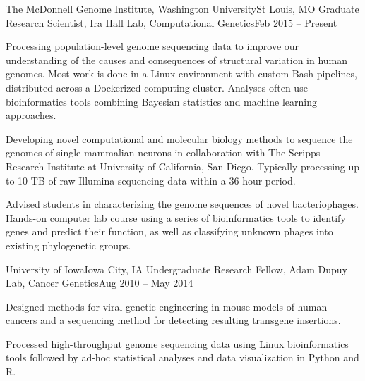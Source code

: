     \resumeSubheading
      {The McDonnell Genome Institute, Washington University}{St Louis, MO}
      {Graduate Research Scientist, Ira Hall Lab, Computational Genetics}{Feb 2015 -- Present}
      
      \resumeItemListStart
      
          {Processing population-level genome sequencing data to improve our understanding of the causes and consequences of structural variation in human genomes. Most work is done in a Linux environment with custom Bash pipelines, distributed across a Dockerized computing cluster. Analyses often use bioinformatics tools combining Bayesian statistics and machine learning approaches.}
       
          {Developing novel computational and molecular biology methods to sequence the genomes of single mammalian neurons in collaboration with The Scripps Research Institute at University of California, San Diego. Typically processing up to 10 TB of raw Illumina sequencing data within a 36 hour period.}
       
          {Advised students in characterizing the genome sequences of novel bacteriophages. Hands-on computer lab course using a series of bioinformatics tools to identify genes and predict their function, as well as classifying unknown phages into existing phylogenetic groups.}
          
      \resumeItemListEnd
      
    \resumeSubheading
      {University of Iowa}{Iowa City, IA}
      {Undergraduate Research Fellow, Adam Dupuy Lab, Cancer Genetics}{Aug 2010 -- May 2014}
      
      \resumeItemListStart
      
          {Designed methods for viral genetic engineering in mouse models of human cancers and a sequencing method for detecting resulting transgene insertions.}
       
          {Processed high-throughput genome sequencing data using Linux bioinformatics tools followed by ad-hoc statistical analyses and data visualization in Python and R.}
       
      \resumeItemListEnd
      
  \resumeSubHeadingListEnd

